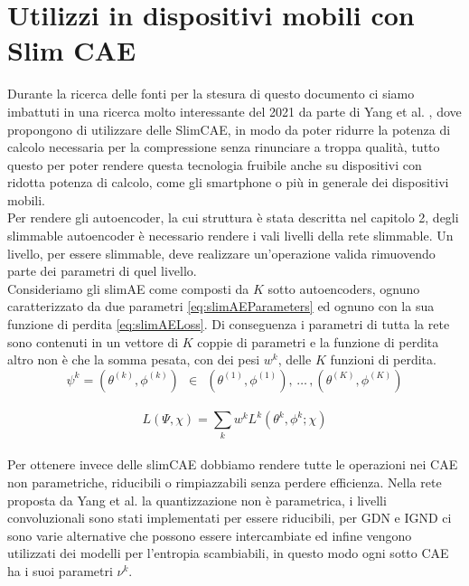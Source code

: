 \section{Utilizzi in dispositivi mobili con Slim CAE}

Durante la ricerca delle fonti per la stesura di questo documento ci siamo imbattuti in una ricerca molto interessante del 2021 da parte di Yang et al. \cite{yang2021slimmable}, dove propongono di utilizzare delle SlimCAE, in modo da poter ridurre la potenza di calcolo necessaria per la compressione senza rinunciare a troppa qualità, tutto questo per poter rendere questa tecnologia fruibile anche su dispositivi con ridotta potenza di calcolo, come gli smartphone o più in generale dei dispositivi mobili.\\
Per rendere gli autoencoder, la cui struttura è stata descritta nel capitolo 2, degli slimmable autoencoder è necessario rendere i vali livelli della rete slimmable. Un livello, per essere slimmable, deve realizzare un’operazione valida rimuovendo parte dei parametri di quel livello.\\
Consideriamo gli slimAE come composti da $K$ sotto autoencoders, ognuno caratterizzato da due parametri \ref{eq:slimAEParameters} ed ognuno con la sua funzione di perdita \ref{eq:slimAELoss}. Di conseguenza i parametri di tutta la rete sono contenuti in un vettore di $K$ coppie di parametri e la funzione di perdita altro non è che la somma pesata, con dei pesi $w^{k}$, delle $K$ funzioni di perdita.\\
\begin{equation}\label{eq:slimAEParameters}
\psi^{k} = (\theta^{(k)},\phi^{(k)}) \:\: \in \:\: {(\theta^{(1)},\phi^{(1)}),\,…\, , (\theta^{(K)},\phi^{(K)})}
\end{equation}\\
\begin{equation}\label{eq:slimAELoss}
L(\Psi, \chi) = \sum_{k} w^{k} L^{k} (\theta^{k}, \phi^{k}; \chi)
\end{equation}\\
Per ottenere invece delle slimCAE dobbiamo rendere tutte le operazioni nei CAE non parametriche, riducibili o rimpiazzabili senza perdere efficienza. Nella rete proposta da Yang et al. la quantizzazione non è parametrica, i livelli convoluzionali sono stati implementati per essere riducibili, per GDN e IGND \cite{balle2018efficient} ci sono varie alternative che possono essere intercambiate ed infine vengono utilizzati dei modelli per l’entropia scambiabili, in questo modo ogni sotto CAE ha i suoi parametri $\nu^{k}$.\\
